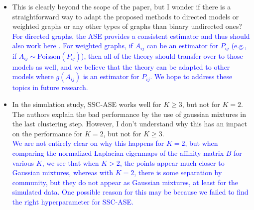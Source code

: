 \documentclass[
]{article}
\begin{document}
\begin{itemize}
{  SSC-ASE does rely on the latent configuration, but we show that the orthogonality property holds for the particular embedding we perform for this algorithm. 
  }\\
  \textcolor{blue}{
  That said, looking back at the latent configuration in Theorem 1, we can see that a $K$-dimensional (not $K^2$-dimensional) latent configuration is sufficient for clustering. 
  If we are able to obtain this exact embedding, this would greatly reduce the number of dimensions required for the clustering 
  In practice, this isn't always possible due to the nonidentifiability issue (in particular, determining which of the $K$ out of $K^2$ eigenvectors should be used, although we have found via numerical experiments that community detection is often possible with the $2^{nd}$ to the $(K+1)^{st}$ embedding dimensions).
  }
\item
  This is clearly beyond the scope of the paper, but I wonder if there
  is a straightforward way to adapt the proposed methods to directed
  models or weighted graphs or any other types of graphs than binary
  undirected ones?\\
  \textcolor{blue}{
  For directed graphs, the ASE provides a consistent estimator and thus should also work here \citep{doi:10.1080/01621459.2012.699795}. 
  For weighted graphs, if $A_{ij}$ can be an estimator for $P_{ij}$ (e.g., if $A_{ij} \sim \mathrm{Poisson}(P_{ij})$), then all of the theory should transfer over to those models as well, 
  and we believe that the theory can be adapted to other models where $g(A_{ij})$ is an estimator for $P_{ij}$. 
  We hope to address these topics in future research. 
  }
\item
  In the simulation study, SSC-ASE works well for \(K \geq 3\), but not
  for \(K = 2\). The authors explain the bad performance by the use of
  gaussian mixtures in the last clustering step. However, I don't
  understand why this has an impact on the performance for \(K = 2\),
  but not for \(K \geq 3\).\\
  \textcolor{blue}{
  We are not entirely clear on why this happens for $K = 2$, but when comparing the normalized Laplacian eigenmaps of the affinity matrix $B$ for various $K$, we see that when $K > 2$, the points appear much closer to Gaussian mixtures, whereas with $K = 2$, there is some separation by community, but they do not appear as Gaussian mixtures, at least for the simulated data. 
  One possible reason for this may be because we failed to find the right hyperparameter for SSC-ASE. 
  }\\

\end{itemize}
\end{document}
